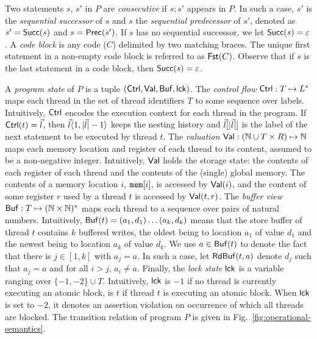 Two statements $s$, $s'$ in $P$ are {\em consecutive} if $s;s'$ appears in $P$.
In such a case, $s'$ is the {\em sequential successor} of $s$ and $s$ the {\em sequential predecessor} of $s'$, denoted as $s'=\mathsf{Succ}(s)$ and $s=\mathsf{Prec}(s')$.
If $s$ has no sequential successor, we let $\mathsf{Succ}(s)=\varepsilon$.
A {\em code block} is any code ($C$) delimited by two matching braces.
The unique first statement in a non-empty code block is referred to as $\mathsf{Fst}(C)$.
Observe that if $s$ is the last statement in a code block, then $\mathsf{Succ}(s)=\varepsilon$.

A {\em program state} of $P$ is a tuple $(\mathsf{Ctrl},\mathsf{Val},\mathsf{Buf},\mathsf{lck})$.
The {\em control flow} $\mathsf{Ctrl}:T \mapsto L^*$ maps each thread in the set of thread identifiers $T$ to some sequence over labels.
Intuitively, $\mathsf{Ctrl}$ encodes the execution context for each thread in the program.
If $\mathsf{Ctrl}(t)=\vec{l}$, then $\vec{l} \langle 1,|\vec{l}|-1\rangle$ keeps the nesting history and $\vec{l}[|\vec{l}|]$ is the label of the next statement to be executed by thread $t$.
The {\em valuation} $\mathsf{Val}:(\mathbb{N}\cup T\times R)\mapsto \mathbb{N}$ maps each memory location and register of each thread to its content, assumed to be a non-negative integer.
Intuitively, $\mathsf{Val}$ holds the storage state: the contents of each register of each thread and the contents of the (single) global memory.
The contents of a memory location $i$, $\mathtt{mem}[i]$, is accessed by $\mathsf{Val}(i)$, and the content of some register $r$ used by a thread $t$ is accessed by $\mathsf{Val}(t,r)$.
The {\em buffer view} $\mathsf{Buf}:T \mapsto (\mathbb{N}\times\mathbb{N})^*$ maps each thread to a sequence over pairs of natural numbers.
Intuitively, $\mathsf{Buf}(t)=(a_1,d_1)\ldots(a_k,d_k)$ means that the store buffer of thread $t$ contains $k$ buffered writes, the oldest being to location $a_1$ of value $d_1$ and the newest being to location $a_k$ of value $d_k$.
We use $a\in\mathsf{Buf}(t)$ to denote the fact that there is $j\in[1,k]$ with $a_j=a$.
In such a case, let $\mathsf{RdBuf}(t,a)$ denote $d_j$ such that $a_j=a$ and for all $i>j$, $a_i\neq a$.
Finally, the {\em lock state} $\mathsf{lck}$ is a variable ranging over $\{-1,-2\}\cup T$.
Intuitively, $\mathsf{lck}$ is $-1$ if no thread is currently executing an atomic block, is $t$ if thread $t$ is executing an atomic block.
When $\mathsf{lck}$ is set to $-2$, it denotes an assertion violation on occurrence of which all threads are blocked.
The transition relation of program $P$ is given in Fig.~\ref{fig:operational-semantics}.

